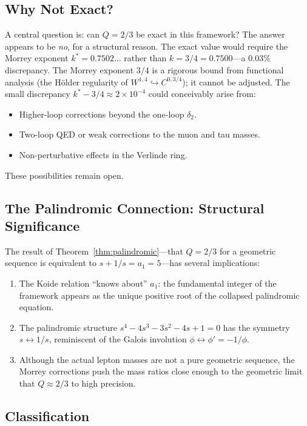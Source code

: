 \documentclass[12pt,a4paper]{article}
\theoremstyle{definition}
\begin{document}
\subsection{Why Not Exact?}

A central question is: can $Q = 2/3$ be exact in this framework?  The answer appears to be \emph{no}, for a structural reason.  The exact value would require the Morrey exponent $k^* = 0.7502\ldots$ rather than $k = 3/4 = 0.7500$---a $0.03\%$ discrepancy.  The Morrey exponent $3/4$ is a rigorous bound from functional analysis (the H\"older regularity of $W^{1,4} \hookrightarrow C^{0,3/4}$); it cannot be adjusted.  The small discrepancy $k^* - 3/4 \approx 2 \times 10^{-4}$ could conceivably arise from:
\begin{itemize}
\item Higher-loop corrections beyond the one-loop $\delta_2$.
\item Two-loop QED or weak corrections to the muon and tau masses.
\item Non-perturbative effects in the Verlinde ring.
\end{itemize}
These possibilities remain open.

\subsection{The Palindromic Connection: Structural Significance}

The result of Theorem~\ref{thm:palindromic}---that $Q = 2/3$ for a geometric sequence is equivalent to $s + 1/s = a_1 = 5$---has several implications:
\begin{enumerate}
\item The Koide relation ``knows about'' $a_1$: the fundamental integer of the framework appears as the unique positive root of the collapsed palindromic equation.
\item The palindromic structure $s^4 - 4s^3 - 3s^2 - 4s + 1 = 0$ has the symmetry $s \leftrightarrow 1/s$, reminiscent of the Galois involution $\phi \leftrightarrow \phi' = -1/\phi$.
\item Although the actual lepton masses are not a pure geometric sequence, the Morrey corrections push the mass ratios close enough to the geometric limit that $Q \approx 2/3$ to high precision.
\end{enumerate}

\subsection{Classification}
\end{document}
